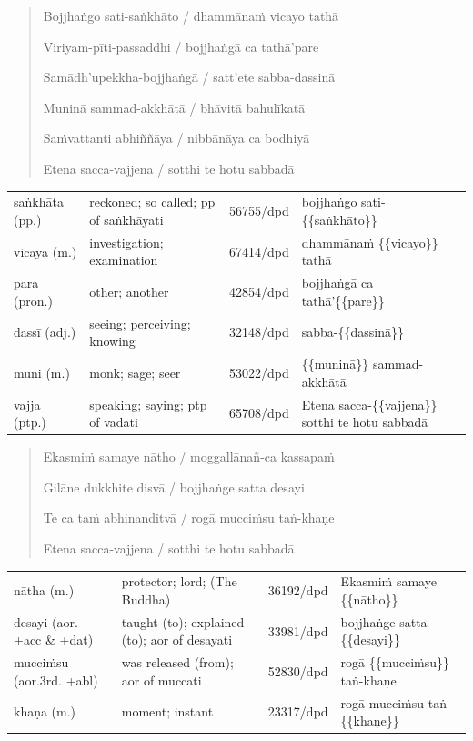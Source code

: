 \documentclass[11pt,oneside]{memoir}
\begin{document}
\begin{quote}
Bojjhaṅgo sati-saṅkhāto / dhammānaṁ vicayo tathā

Viriyam-pīti-passaddhi / bojjhaṅgā ca tathā'pare

Samādh'upekkha-bojjhaṅgā / satt'ete sabba-dassinā

Muninā sammad-akkhātā / bhāvitā bahulīkatā

Saṁvattanti abhiññāya / nibbānāya ca bodhiyā

Etena sacca-vajjena / sotthi te hotu sabbadā
\end{quote}

\begin{longtable}{L{\colOne} L{\colTwo} H H}
saṅkhāta (pp.) & reckoned; so called; pp of saṅkhāyati & 56755/dpd & bojjhaṅgo sati-\{\{saṅkhāto\}\}\\[0pt]
vicaya (m.) & investigation; examination & 67414/dpd & dhammānaṁ \{\{vicayo\}\} tathā\\[0pt]
para (pron.) & other; another & 42854/dpd & bojjhaṅgā ca tathā'\{\{pare\}\}\\[0pt]
dassī (adj.) & seeing; perceiving; knowing & 32148/dpd & sabba-\{\{dassinā\}\}\\[0pt]
muni (m.) & monk; sage; seer & 53022/dpd & \{\{muninā\}\} sammad-akkhātā\\[0pt]
vajja (ptp.) & speaking; saying; ptp of vadati & 65708/dpd & Etena sacca-\{\{vajjena\}\} sotthi te hotu sabbadā\\[0pt]
\end{longtable}

\begin{quote}
Ekasmiṁ samaye nātho / moggallānañ-ca kassapaṁ

Gilāne dukkhite disvā / bojjhaṅge satta desayi

Te ca taṁ abhinanditvā / rogā mucciṁsu taṅ-khaṇe

Etena sacca-vajjena / sotthi te hotu sabbadā
\end{quote}

\begin{longtable}{L{\colOne} L{\colTwo} H H}
nātha (m.) & protector; lord; (The Buddha) & 36192/dpd & Ekasmiṁ samaye \{\{nātho\}\}\\[0pt]
desayi (aor. +acc \& +dat) & taught (to); explained (to); aor of desayati & 33981/dpd & bojjhaṅge satta \{\{desayi\}\}\\[0pt]
mucciṁsu (aor.3rd. +abl) & was released (from); aor of muccati & 52830/dpd & rogā \{\{mucciṁsu\}\} taṅ-khaṇe\\[0pt]
khaṇa (m.) & moment; instant & 23317/dpd & rogā mucciṁsu taṅ-\{\{khaṇe\}\}\\[0pt]
\end{longtable}
\end{document}
